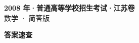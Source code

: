\documentclass[zihao=-4, a4paper]{ctexart}
\begin{document}
\begin{center}
  {\Large\bfseries 2008 年·普通高等学校招生考试·江苏卷}\\[4pt]
  {\large 数学 · 简答版}
\end{center}
\medskip
{}

\clearpage
{}
\begin{center}{\Large\bfseries 答案速查}\end{center}
\medskip

\end{document}
